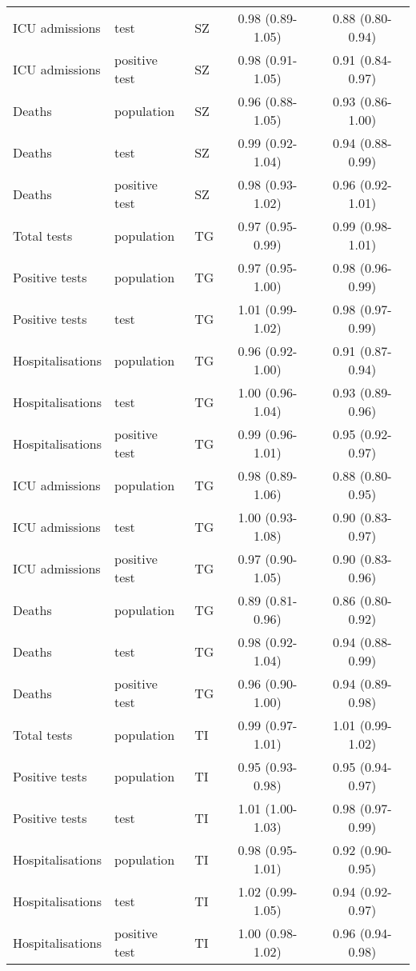 \documentclass{article}
\begin{document}
\begin{longtable}{lllcc}
		ICU admissions & test & SZ & 0.98 (0.89-1.05) & 0.88 (0.80-0.94) \\ 
		ICU admissions & positive test & SZ & 0.98 (0.91-1.05) & 0.91 (0.84-0.97) \\ 
		Deaths & population & SZ & 0.96 (0.88-1.05) & 0.93 (0.86-1.00) \\ 
		Deaths & test & SZ & 0.99 (0.92-1.04) & 0.94 (0.88-0.99) \\ 
		Deaths & positive test & SZ & 0.98 (0.93-1.02) & 0.96 (0.92-1.01) \\ 
		Total tests & population & TG & 0.97 (0.95-0.99) & 0.99 (0.98-1.01) \\ 
		Positive tests & population & TG & 0.97 (0.95-1.00) & 0.98 (0.96-0.99) \\ 
		Positive tests & test & TG & 1.01 (0.99-1.02) & 0.98 (0.97-0.99) \\ 
		Hospitalisations & population & TG & 0.96 (0.92-1.00) & 0.91 (0.87-0.94) \\ 
		Hospitalisations & test & TG & 1.00 (0.96-1.04) & 0.93 (0.89-0.96) \\ 
		Hospitalisations & positive test & TG & 0.99 (0.96-1.01) & 0.95 (0.92-0.97) \\ 
		ICU admissions & population & TG & 0.98 (0.89-1.06) & 0.88 (0.80-0.95) \\ 
		ICU admissions & test & TG & 1.00 (0.93-1.08) & 0.90 (0.83-0.97) \\ 
		ICU admissions & positive test & TG & 0.97 (0.90-1.05) & 0.90 (0.83-0.96) \\ 
		Deaths & population & TG & 0.89 (0.81-0.96) & 0.86 (0.80-0.92) \\ 
		Deaths & test & TG & 0.98 (0.92-1.04) & 0.94 (0.88-0.99) \\ 
		Deaths & positive test & TG & 0.96 (0.90-1.00) & 0.94 (0.89-0.98) \\ 
		Total tests & population & TI & 0.99 (0.97-1.01) & 1.01 (0.99-1.02) \\ 
		Positive tests & population & TI & 0.95 (0.93-0.98) & 0.95 (0.94-0.97) \\ 
		Positive tests & test & TI & 1.01 (1.00-1.03) & 0.98 (0.97-0.99) \\ 
		Hospitalisations & population & TI & 0.98 (0.95-1.01) & 0.92 (0.90-0.95) \\ 
		Hospitalisations & test & TI & 1.02 (0.99-1.05) & 0.94 (0.92-0.97) \\ 
		Hospitalisations & positive test & TI & 1.00 (0.98-1.02) & 0.96 (0.94-0.98) \\ 

\end{longtable}
\end{document}
